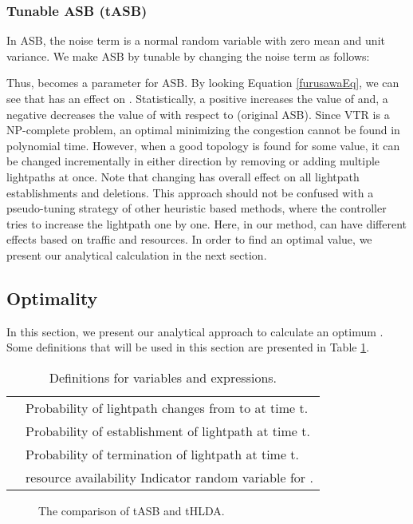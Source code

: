 \documentclass[conference]{IEEEtran}
\begin{document}
\subsubsection{Tunable ASB (tASB)}
In ASB, the noise term is a normal random variable with zero mean and unit variance. We make ASB by tunable by changing the noise term as follows:

Thus,   becomes a parameter for ASB. 
By looking Equation \ref{furusawaEq}, we can see that  has an effect on .
Statistically, a positive    increases the value of  and, a negative  decreases the value of  with respect to  (original ASB). 
Since VTR is a NP-complete problem, an optimal  minimizing the congestion cannot be found in polynomial time.
However, when a good topology is found for some  value, it can be changed incrementally in either direction by removing or adding multiple lightpaths at once.
Note that changing  has overall effect on all lightpath establishments and deletions.
This approach should not be confused with a pseudo-tuning strategy of other heuristic based methods, where the controller tries to increase the lightpath one by one. 
Here, in our method,  can have different effects based on traffic and resources. In order to find an optimal  value, we present our analytical calculation in the next section.
\subsection{Optimality}\label{optimality}
In this section, we present our analytical approach to calculate an optimum .
Some definitions that will be used in this section are presented in Table \ref{definitions}.
\begin{table}[h]
\caption{Definitions for variables and expressions.} \label{definitions}
\begin{tabular}{ll} \hline
 & Probability of lightpath  changes from  to  at time t.	\\
 & Probability of  establishment of lightpath  at time t.	\\
 & Probability of  termination of lightpath   at time t.	\\
	& resource availability Indicator random variable for .				\\
\hline
 \end{tabular}
\end{table}
 
 \begin{figure*}[t]
  \centering
\def\factor{0.3}
\hfill
\hfill
\hfill
 
  \caption{ The comparison of tASB and tHLDA.} 
\label{reconf}
\end{figure*} 
 
\end{document}

